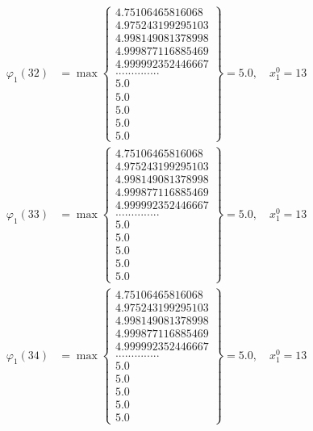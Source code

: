 \documentclass{article}
\begin{document}
\begin{align*}
  
  
  
\varphi_{1}(32) &= \max \left\{ \begin{array}{c}
4.75106465816068 \\
 4.975243199295103 \\
 4.998149081378998 \\
 4.999877116885469 \\
 4.999992352446667 \\
 .............. \\
 5.0 \\
 5.0 \\
 5.0 \\
 5.0 \\
 5.0
\end{array} \right\} = 5.0, \quad x_{1}^0 = 13\\
  
  
  
  
\varphi_{1}(33) &= \max \left\{ \begin{array}{c}
4.75106465816068 \\
 4.975243199295103 \\
 4.998149081378998 \\
 4.999877116885469 \\
 4.999992352446667 \\
 .............. \\
 5.0 \\
 5.0 \\
 5.0 \\
 5.0 \\
 5.0
\end{array} \right\} = 5.0, \quad x_{1}^0 = 13\\
  
  
  
  
\varphi_{1}(34) &= \max \left\{ \begin{array}{c}
4.75106465816068 \\
 4.975243199295103 \\
 4.998149081378998 \\
 4.999877116885469 \\
 4.999992352446667 \\
 .............. \\
 5.0 \\
 5.0 \\
 5.0 \\
 5.0 \\
 5.0
\end{array} \right\} = 5.0, \quad x_{1}^0 = 13\\
  

\end{align*}
\end{document}
